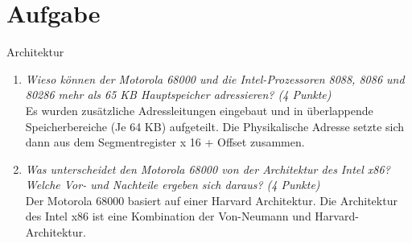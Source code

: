 \documentclass[10pt]{article}
\begin{document}
\section{Aufgabe}
Architektur
\begin{enumerate}[label=\alph*)]
	\item 
	\textit{Wieso können der Motorola 68000 und die Intel-Prozessoren 8088, 8086 und 80286 mehr als 65 KB Hauptspeicher adressieren?
(4 Punkte)	} \\
	Es wurden zusätzliche Adressleitungen eingebaut und in überlappende Speicherbereiche (Je 64 KB) aufgeteilt. Die Physikalische Adresse setzte sich dann aus dem Segmentregister x 16 + Offset zusammen.	
	
	\item
	\textit{Was unterscheidet den Motorola 68000 von der Architektur des Intel x86? Welche Vor- und Nachteile ergeben sich daraus? (4 Punkte)}\\
	Der Motorola 68000 basiert auf einer Harvard Architektur.
	Die Architektur des Intel x86 ist eine Kombination der Von-Neumann und Harvard-Architektur.
	
\end{enumerate}
\newpage
\end{document}
